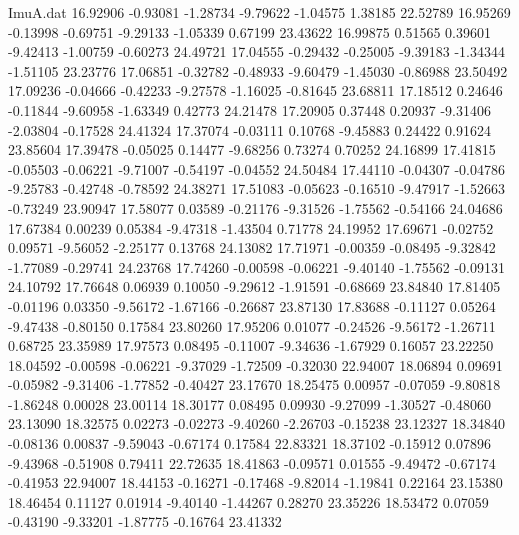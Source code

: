 \begin{filecontents}{ImuA.dat}
  16.92906   -0.93081   -1.28734   -9.79622   -1.04575    1.38185   22.52789
  16.95269   -0.13998   -0.69751   -9.29133   -1.05339    0.67199   23.43622
  16.99875    0.51565    0.39601   -9.42413   -1.00759   -0.60273   24.49721
  17.04555   -0.29432   -0.25005   -9.39183   -1.34344   -1.51105   23.23776
  17.06851   -0.32782   -0.48933   -9.60479   -1.45030   -0.86988   23.50492
  17.09236   -0.04666   -0.42233   -9.27578   -1.16025   -0.81645   23.68811
  17.18512    0.24646   -0.11844   -9.60958   -1.63349    0.42773   24.21478
  17.20905    0.37448    0.20937   -9.31406   -2.03804   -0.17528   24.41324
  17.37074   -0.03111    0.10768   -9.45883    0.24422    0.91624   23.85604
  17.39478   -0.05025    0.14477   -9.68256    0.73274    0.70252   24.16899
  17.41815   -0.05503   -0.06221   -9.71007   -0.54197   -0.04552   24.50484
  17.44110   -0.04307   -0.04786   -9.25783   -0.42748   -0.78592   24.38271
  17.51083   -0.05623   -0.16510   -9.47917   -1.52663   -0.73249   23.90947
  17.58077    0.03589   -0.21176   -9.31526   -1.75562   -0.54166   24.04686
  17.67384    0.00239    0.05384   -9.47318   -1.43504    0.71778   24.19952
  17.69671   -0.02752    0.09571   -9.56052   -2.25177    0.13768   24.13082
  17.71971   -0.00359   -0.08495   -9.32842   -1.77089   -0.29741   24.23768
  17.74260   -0.00598   -0.06221   -9.40140   -1.75562   -0.09131   24.10792
  17.76648    0.06939    0.10050   -9.29612   -1.91591   -0.68669   23.84840
  17.81405   -0.01196    0.03350   -9.56172   -1.67166   -0.26687   23.87130
  17.83688   -0.11127    0.05264   -9.47438   -0.80150    0.17584   23.80260
  17.95206    0.01077   -0.24526   -9.56172   -1.26711    0.68725   23.35989
  17.97573    0.08495   -0.11007   -9.34636   -1.67929    0.16057   23.22250
  18.04592   -0.00598   -0.06221   -9.37029   -1.72509   -0.32030   22.94007
  18.06894    0.09691   -0.05982   -9.31406   -1.77852   -0.40427   23.17670
  18.25475    0.00957   -0.07059   -9.80818   -1.86248    0.00028   23.00114
  18.30177    0.08495    0.09930   -9.27099   -1.30527   -0.48060   23.13090
  18.32575    0.02273   -0.02273   -9.40260   -2.26703   -0.15238   23.12327
  18.34840   -0.08136    0.00837   -9.59043   -0.67174    0.17584   22.83321
  18.37102   -0.15912    0.07896   -9.43968   -0.51908    0.79411   22.72635
  18.41863   -0.09571    0.01555   -9.49472   -0.67174   -0.41953   22.94007
  18.44153   -0.16271   -0.17468   -9.82014   -1.19841    0.22164   23.15380
  18.46454    0.11127    0.01914   -9.40140   -1.44267    0.28270   23.35226
  18.53472    0.07059   -0.43190   -9.33201   -1.87775   -0.16764   23.41332

\end{filecontents}
